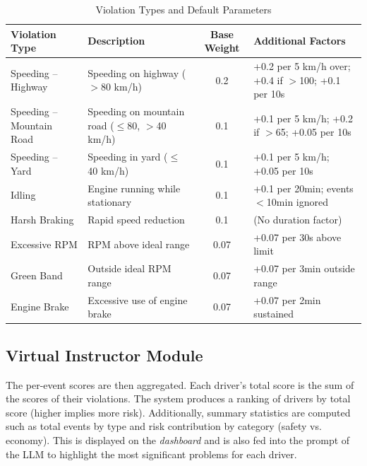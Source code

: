 \documentclass[12pt]{article}
\begin{document}
\begin{table}[h!]
    \centering
    \caption{Violation Types and Default Parameters}
    \label{tab:violation_types} %
    \tiny %
    \setlength{\tabcolsep}{3pt} %
    \begin{tabular}{|l|p{2.5cm}|c|p{4cm}|} %
        \hline
        \textbf{Violation Type} & \textbf{Description} & \textbf{Base Weight} & \textbf{Additional Factors} \\
        \hline
        Speeding – Highway & Speeding on highway ($>$80 km/h) & 0.2 & +0.2 per 5 km/h over; +0.4 if $>$100; +0.1 per 10s \\
        Speeding – Mountain Road & Speeding on mountain road ($\le$80, $>$40 km/h) & 0.1 & +0.1 per 5 km/h; +0.2 if $>$65; +0.05 per 10s \\
        Speeding – Yard & Speeding in yard ($\le$40 km/h) & 0.1 & +0.1 per 5 km/h; +0.05 per 10s \\
        Idling & Engine running while stationary & 0.1 & +0.1 per 20min; events $<$10min ignored \\
        Harsh Braking & Rapid speed reduction & 0.1 & (No duration factor) \\
        Excessive RPM & RPM above ideal range & 0.07 & +0.07 per 30s above limit \\
        Green Band & Outside ideal RPM range & 0.07 & +0.07 per 3min outside range \\
        Engine Brake & Excessive use of engine brake & 0.07 & +0.07 per 2min sustained \\
        \hline
    \end{tabular}
\end{table}

\subsection{Virtual Instructor Module}

The per-event scores are then aggregated. Each driver’s total score is the sum of the scores of their violations. The system produces a ranking of drivers by total score (higher implies more risk). Additionally, summary statistics are computed such as total events by type and risk contribution by category (safety vs. economy). This is displayed on the \textit{dashboard} and is also fed into the prompt of the LLM to highlight the most significant problems for each driver.
\end{document}
